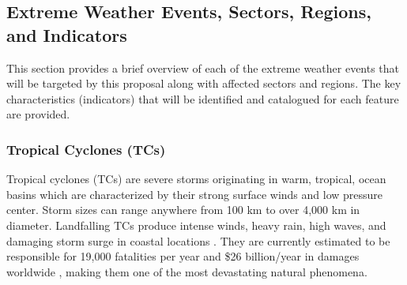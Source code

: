 \documentclass[11pt]{article}
\newcommand\citep{\cite}
\begin{document}



\subsection{Extreme Weather Events, Sectors, Regions, and Indicators} \label{sec:ExtremeWeather}

This section provides a brief overview of each of the extreme weather events that will be targeted by this proposal along with affected sectors and regions.  The key characteristics (indicators) that will be identified and catalogued for each feature are provided.

\subsubsection*{Tropical Cyclones (TCs)}

Tropical cyclones (TCs) are severe storms originating in warm, tropical, ocean basins which are characterized by their strong surface winds and low pressure center. Storm sizes can range anywhere from 100 km to over 4,000 km in diameter. Landfalling TCs produce intense winds, heavy rain, high waves, and damaging storm surge in coastal locations \citep{EmanuelDivineWind}. They are currently estimated to be responsible for 19,000 fatalities per year and \$26 billion/year in damages worldwide \citep{Mendelsohn2012}, making them one of the most devastating natural phenomena.
\end{document}

